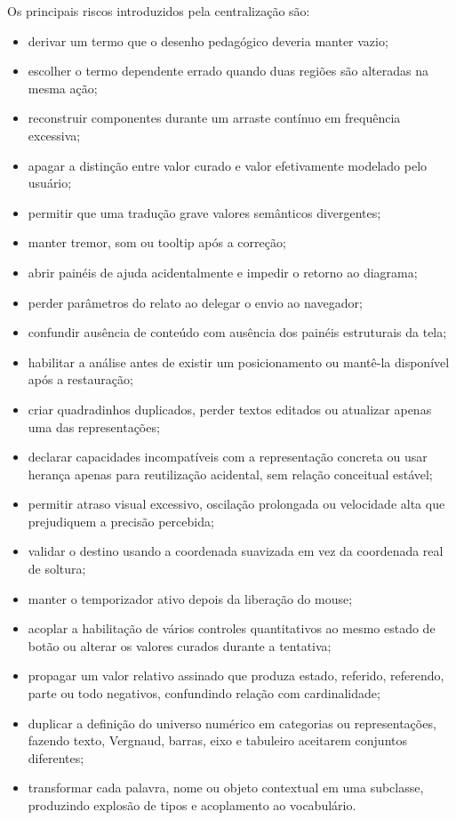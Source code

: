 \documentclass[12pt,a4paper]{article}
\begin{document}
Os principais riscos introduzidos pela centralização são:
\begin{itemize}[noitemsep]
  \item derivar um termo que o desenho pedagógico deveria manter vazio;
  \item escolher o termo dependente errado quando duas regiões são alteradas na mesma ação;
  \item reconstruir componentes durante um arraste contínuo em frequência excessiva;
  \item apagar a distinção entre valor curado e valor efetivamente modelado pelo usuário;
  \item permitir que uma tradução grave valores semânticos divergentes;
  \item manter tremor, som ou tooltip após a correção;
  \item abrir painéis de ajuda acidentalmente e impedir o retorno ao diagrama;
  \item perder parâmetros do relato ao delegar o envio ao navegador;
  \item confundir ausência de conteúdo com ausência dos painéis estruturais da tela;
  \item habilitar a análise antes de existir um posicionamento ou mantê-la disponível após a restauração;
  \item criar quadradinhos duplicados, perder textos editados ou atualizar apenas uma das representações;
  \item declarar capacidades incompatíveis com a representação concreta ou usar herança apenas para reutilização acidental, sem relação conceitual estável;
  \item permitir atraso visual excessivo, oscilação prolongada ou velocidade alta que prejudiquem a precisão percebida;
  \item validar o destino usando a coordenada suavizada em vez da coordenada real de soltura;
  \item manter o temporizador ativo depois da liberação do mouse;
  \item acoplar a habilitação de vários controles quantitativos ao mesmo estado de botão ou alterar os valores curados durante a tentativa;
  \item propagar um valor relativo assinado que produza estado, referido, referendo, parte ou todo negativos, confundindo relação com cardinalidade;
  \item duplicar a definição do universo numérico em categorias ou representações, fazendo texto, Vergnaud, barras, eixo e tabuleiro aceitarem conjuntos diferentes;
  \item transformar cada palavra, nome ou objeto contextual em uma subclasse, produzindo explosão de tipos e acoplamento ao vocabulário.
\end{itemize}
\end{document}
